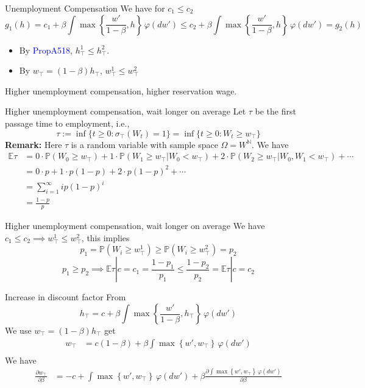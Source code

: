 \begin{frame}{Unemployment Compensation}
    We have for $c_1\le c_2$
    $$
    g_1(h) = c_1 + \beta \int \max\left\{\frac{w'}{1-\beta}, h\right\}\,\varphi(dw')\le c_2 + \beta \int \max\left\{\frac{w'}{1-\beta}, h\right\}\,\varphi(dw') = g_2(h)
    $$
\begin{itemize}
    \item By \textcolor{blue}{PropA518}, $h^1_\top \le h^2_\top$.
    \item By $w_\top = (1-\beta)h_\top$, $w^1_\top\le w^2_\top$
\end{itemize}
Higher unemployment compensation, higher reservation wage.
\end{frame}

\begin{frame}{Higher unemployment compensation, wait longer on average}
Let $\tau$ be the first passage time to employment, i.e.,
$$
\tau:= \inf\{t\ge 0: \sigma_\top (W_t) = 1\} = \inf\{t\ge 0: W_t\ge w_\top\}
$$
\textbf{Remark:} Here $\tau$ is a random variable with sample space $\Omega = W^\mathbb{N}$. We have
\begin{align*}
    \mathbb{E}\tau  &= 0\cdot \mathbb{P}(W_0\ge w_\top) + 1\cdot \mathbb{P}(W_1\ge w_\top
    |W_0< w_\top)+ 2\cdot \mathbb{P}(W_2\ge w_\top|W_0,W_1<w_\top)+\cdots\\
    &= 0\cdot p + 1\cdot p(1-p) + 2\cdot p(1-p)^2 + \cdots\\
    &= \sum_{i=1}^\infty ip(1-p)^i\tag{mean of Geometric distribution}\\
    &=\frac{1-p}{p}
\end{align*}
\end{frame}

\begin{frame}{Higher unemployment compensation, wait longer on average}
    We have $c_1\le c_2\implies w_\top^1\le w_\top^2$, this implies
    $$
    p_1 = \mathbb{P}(W_i\ge w^1_\top)\ge \mathbb{P}(W_i\ge w_\top^2) = p_2
    $$
    $$
    p_1\ge p_2\implies\mathbb{E}\tau|c=c_1 = \frac{1-p_1}{p_1} \le  \frac{1-p_2}{p_2} = \mathbb{E}\tau|c=c_2
    $$
\end{frame}

\begin{frame}{Increase in discount factor}
    From 
    $$
    h_\top = c+\beta\int \max\left\{\frac{w'}{1-\beta}, h_\top\right\}\, \varphi(dw')
    $$
    We use $w_\top  = (1-\beta)h_\top$ get
    \begin{align*}
         w_\top &= c(1-\beta)+\beta\int \max\left\{w', w_\top\right\}\, \varphi(dw')\\
    \end{align*}
We have
\begin{align*}
    \frac{\partial w_\top}{\partial \beta} &= -c+\int \max\left\{w', w_\top\right\}\, \varphi(dw') + \beta \frac{\partial \int \max\left\{w', w_\top\right\}\, \varphi(dw')}{\partial \beta}\\
\end{align*}
\end{frame}

